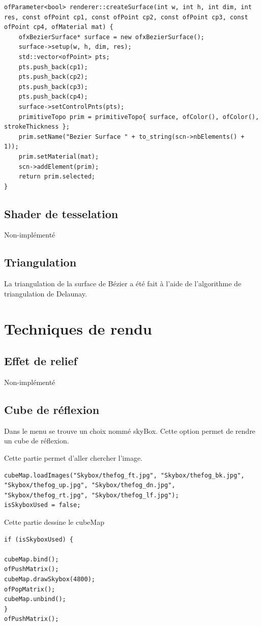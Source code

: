 \begin{lstlisting}
ofParameter<bool> renderer::createSurface(int w, int h, int dim, int res, const ofPoint cp1, const ofPoint cp2, const ofPoint cp3, const ofPoint cp4, ofMaterial mat) {
	ofxBezierSurface* surface = new ofxBezierSurface();
	surface->setup(w, h, dim, res);
	std::vector<ofPoint> pts;
	pts.push_back(cp1);
	pts.push_back(cp2);
	pts.push_back(cp3);
	pts.push_back(cp4);
	surface->setControlPnts(pts);
	primitiveTopo prim = primitiveTopo{ surface, ofColor(), ofColor(), strokeThickness };
	prim.setName("Bezier Surface " + to_string(scn->nbElements() + 1));
	prim.setMaterial(mat);
	scn->addElement(prim);
	return prim.selected;
}
\end{lstlisting}

\subsection{Shader de tesselation}
Non-implémenté

\subsection{Triangulation}
La triangulation de la surface de Bézier a été fait à l'aide de l'algorithme de triangulation de Delaunay. 


\pagebreak
\section{Techniques de rendu}

\subsection{Effet de relief}
Non-implémenté

\subsection{Cube de réflexion}
Dans le menu se trouve un choix nommé skyBox. Cette option permet de rendre un cube de réflexion. 

Cette partie permet d'aller chercher l'image.
\begin{lstlisting}
cubeMap.loadImages("Skybox/thefog_ft.jpg", "Skybox/thefog_bk.jpg", "Skybox/thefog_up.jpg", "Skybox/thefog_dn.jpg", "Skybox/thefog_rt.jpg", "Skybox/thefog_lf.jpg");
isSkyboxUsed = false;
\end{lstlisting}

Cette partie dessine le cubeMap
\begin{lstlisting}
if (isSkyboxUsed) {

cubeMap.bind();
ofPushMatrix();
cubeMap.drawSkybox(4800);
ofPopMatrix();
cubeMap.unbind();
}
ofPushMatrix();
\end{lstlisting}
